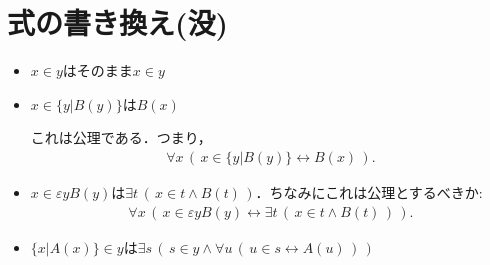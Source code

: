 \section{式の書き換え(没)}
	\begin{itemize}
		\item $x \in y$はそのまま$x \in y$
		\item $x \in \{y|B(y)\}$は$B(x)$
			
			これは公理である．つまり，
			\begin{align}
				\forall x\, \left(\, x \in \{y|B(y)\} \leftrightarrow B(x)\, \right).
			\end{align}
			
		\item $x \in \varepsilon y B(y)$は$\exists t\, \left(\, x \in t \wedge B(t)\, \right)$．ちなみにこれは公理とするべきか:
			\begin{align}
				\forall x\, \left(\, x \in \varepsilon y B(y) \leftrightarrow
				\exists t\, \left(\, x \in t \wedge B(t)\, \right)\, \right).
			\end{align}
			
		\item $\{x|A(x)\} \in y$は$\exists s\, \left(\, s \in y \wedge 
			\forall u\, \left(\, u \in s \leftrightarrow A(u)\, \right)\, \right)$
			

\end{itemize}
